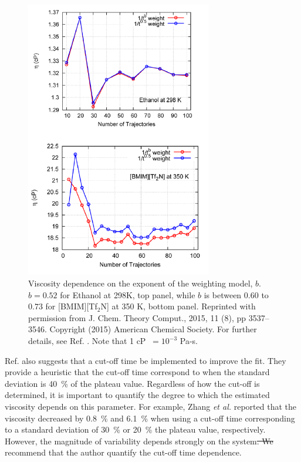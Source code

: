 \documentclass[9pt,bestpractices]{livecoms}
\providecommand{\DIFadd}[1]{{\protect\color{blue}\uwave{#1}}} %
\providecommand{\DIFdel}[1]{{\protect\color{red}\sout{#1}}}                      %
\providecommand{\DIFaddbegin}{} %
\providecommand{\DIFaddend}{} %
\providecommand{\DIFdelbegin}{} %
\providecommand{\DIFdelend}{} %
\begin{document}
\begin{figure}[htb!]
	\centering
	\includegraphics[width=3.2in]{ZhangFig7_12.png}
	\caption{Viscosity dependence on the exponent of the weighting model, $b$. $b = 0.52$ for Ethanol at 298K, top panel, while $b$ is between $0.60$ to $0.73$ for [BMIM][Tf$_2$N] at 350 K, bottom panel. Reprinted with permission from J. Chem. Theory Comput., 2015, 11 (8), pp 3537–3546. Copyright (2015) American Chemical Society. For further details, see Ref. \cite{Zhang2015}. Note that 1 cP $\ = 10^{-3}$ Pa-s.}
	\label{fig:ZhangFig7_12}
\end{figure}

Ref. \cite{Zhang2015} also suggests that a cut-off time be implemented to improve the fit. They provide a heuristic that the cut-off time correspond to when the standard deviation is 40~\% of the plateau value. Regardless of how the cut-off is determined, it is important to quantify the degree to which the estimated viscosity depends on this parameter. For example, Zhang \textit{et al.} reported that the viscosity decreased by 0.8~\% and 6.1~\% when using a cut-off time corresponding to a standard deviation of 30~\% or 20~\% the plateau value, respectively. However, \DIFaddbegin \DIFadd{since }\DIFaddend the magnitude of variability depends strongly on the system\DIFdelbegin \DIFdel{. We }\DIFdelend \DIFaddbegin \DIFadd{, we }\DIFaddend recommend that the author quantify the cut-off time dependence.
\end{document}
